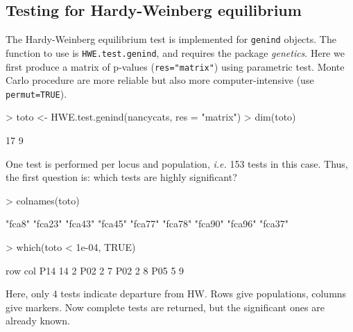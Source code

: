 \documentclass{article}
\begin{document}
\subsection{Testing for Hardy-Weinberg equilibrium}
The Hardy-Weinberg equilibrium test is implemented for \texttt{genind} objects.
The function to use is \texttt{HWE.test.genind}, and requires the package \emph{genetics}.
Here we first produce a matrix of p-values (\texttt{res="matrix"}) using parametric test.
Monte Carlo procedure are more reliable but also more computer-intensive (use \texttt{permut=TRUE}).
\begin{Schunk}
\begin{Sinput}
> toto <- HWE.test.genind(nancycats, res = "matrix")
> dim(toto)
\end{Sinput}
\begin{Soutput}
[1] 17  9
\end{Soutput}
\end{Schunk}
One test is performed per locus and population, \textit{i.e.} 153 tests in this case.
Thus, the first question is: which tests are highly significant?
\begin{Schunk}
\begin{Sinput}
> colnames(toto)
\end{Sinput}
\begin{Soutput}
[1] "fca8"  "fca23" "fca43" "fca45" "fca77" "fca78" "fca90" "fca96" "fca37"
\end{Soutput}
\begin{Sinput}
> which(toto < 1e-04, TRUE)
\end{Sinput}
\begin{Soutput}
    row col
P14  14   2
P02   2   7
P02   2   8
P05   5   9
\end{Soutput}
\end{Schunk}
Here, only 4 tests indicate departure from HW.
Rows give populations, columns give markers.
Now complete tests are returned, but the significant ones are already known.
\end{document}
